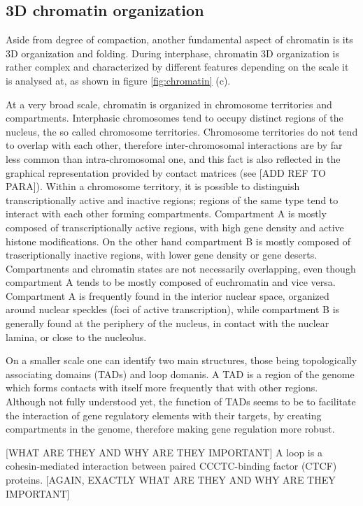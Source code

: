 \subsection{3D chromatin organization}
Aside from degree of compaction, another fundamental aspect of chromatin is its 3D organization and folding. During interphase, chromatin 3D organization is rather complex and characterized by different features depending on the scale it is analysed at\cite{chromatinorganization2019, chromatindevelopment2019}, as shown in figure \ref{fig:chromatin} (c).

At a very broad scale, chromatin is organized in chromosome territories and compartments. Interphasic chromosomes tend to occupy distinct regions of the nucleus, the so called chromosome territories. Chromosome territories do not tend to overlap with each other, therefore inter-chromosomal interactions are by far less common than intra-chromosomal one, and this fact is also reflected in the graphical representation provided by contact matrices (see [ADD REF TO PARA]).
Within a chromosome territory, it is possible to distinguish transcriptionally active and inactive regions; regions of the same type tend to interact with each other forming compartments. Compartment A is mostly composed of transcriptionally active regions, with high gene density and active histone modifications. On the other hand compartment B is mostly composed of trascriptionally inactive regions, with lower gene density or gene deserts. Compartments and chromatin states are not necessarily overlapping, even though compartment A tends to be mostly composed of euchromatin and vice versa. Compartment A is frequently found in the interior nuclear space, organized around nuclear speckles (foci of active transcription), while compartment B is generally found at the periphery of the nucleus, in contact with the nuclear lamina, or close to the nucleolus.

On a smaller scale one can identify two main structures, those being topologically associating domains (TADs) and loop domanis. A TAD is a region of the genome which forms contacts with itself more frequently that with other regions. Although not fully understood yet, the function of TADs seems to be to facilitate the interaction of gene regulatory elements with their targets, by creating compartments in the genome, therefore making gene regulation more robust\cite{tadrole2018}. 

[WHAT ARE THEY AND WHY ARE THEY IMPORTANT] A loop is a cohesin-mediated interaction between paired CCCTC-binding factor (CTCF) proteins. [AGAIN, EXACTLY WHAT ARE THEY AND WHY ARE THEY IMPORTANT]

